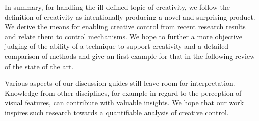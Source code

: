 In summary, for handling the ill-defined topic of creativity, we follow the definition of creativity as intentionally producing a novel and surprising product. We derive the means for enabling creative control from recent research results and relate them to control mechanisms. We hope to further a more objective judging of the ability of a technique to support creativity and a detailed comparison of methods and give an first example for that in the following review of the state of the art.

Various aspects of our discussion guides still leave room for interpretation. Knowledge from other disciplines, for example in regard to the perception of visual features, can contribute with valuable insights. We hope that our work inspires such research towards a quantifiable analysis of creative control.

